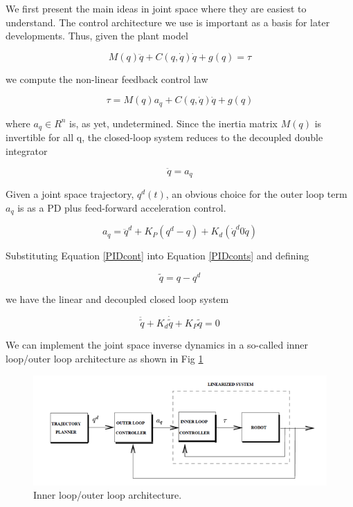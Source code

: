 \documentclass{UoNMCHA}
\numberwithin{equation}{section}
\begin{document}
	
	We first present the main ideas in joint space where they are easiest to understand. The control architecture we use is important as a basis for later developments. Thus, given the plant model
	
	\begin{equation}\label{syseq}
	M(q)\ddot{q}+C(q,\dot{q})\dot{q}+g(q)=\tau
	\end{equation}
	
	we compute the non-linear feedback control law
	
	\begin{equation}\label{feedbacklin}
	\tau = M(q)a_{q}+C(q,\dot{q})\dot{q}+g(q)
	\end{equation}
	
	\newpage
	where $a_q \in R^n$ is, as yet, undetermined. Since the inertia matrix $ M(q) $ is invertible for all q, the closed-loop system reduces to the decoupled double integrator  
	
	\begin{equation}\label{PIDconts}
	\ddot{q} = a_{q}
	\end{equation}
	
	Given a joint space trajectory, $q^d (t)$, an obvious choice for the outer loop term $ a_q $ is as a PD plus feed-forward acceleration control.  
	
	\begin{equation}\label{PIDcont}
	a_{q} = \ddot{q}^d + K_P (q^d - q) + K_d (\dot{q}^d 0 \dot{q})
	\end{equation}
	
	Substituting Equation \ref{PIDcont} into Equation \ref{PIDconts} and defining
	
	\begin{equation}\label{PIDconts}
	\tilde{q} = q - q^d
	\end{equation}
	
	we have the linear and decoupled closed loop system
	
	\begin{equation}
	\ddot{\tilde{q}} + K_d \dot{\tilde{q}} + K_P \tilde{q} = 0
	\end{equation}
	
	We can implement the joint space inverse dynamics in a so-called inner loop/outer loop architecture as shown in Fig \ref{figs/Picture3}
	
	\begin{figure}[H]
		\begin{center}
			\includegraphics[width=1\linewidth]{figs/Picture3}
			\caption{Inner loop/outer loop architecture. \cite{levine_1996_the}}
			\label{figs/Picture3}
		\end{center}
	\end{figure}
	
\end{document}
